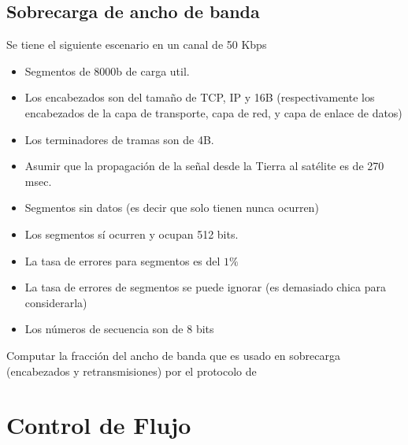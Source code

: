 \documentclass[12pt]{report}
\begin{document}
\begin{exer}
	\subsection{Sobrecarga de ancho de banda \sthree \shard}
	Se tiene el siguiente escenario en un canal de 50 Kbps

	\begin{itemize}
		\item Segmentos de 8000b de carga util.
		\item Los encabezados son del tamaño de TCP, IP y 16B (respectivamente los encabezados de la capa de transporte, capa de red, y capa de enlace de datos)
		\item Los terminadores de tramas son de 4B.
		\item  Asumir que la propagación de la señal desde la Tierra al satélite es de 270 msec.
		\item Segmentos sin datos (es decir que solo tienen  nunca ocurren)
		\item Los segmentos  sí ocurren y ocupan 512 bits.
		\item La tasa de errores para segmentos es del $1\%$
		\item La tasa de errores de segmentos  se puede ignorar (es demasiado chica para considerarla)
		\item Los números de secuencia son de 8 bits
	\end{itemize}

	Computar la fracción del ancho de banda que es usado en sobrecarga
	(encabezados y retransmisiones) por el protocolo de 
\end{exer}

\section{Control de Flujo}
\end{document}
